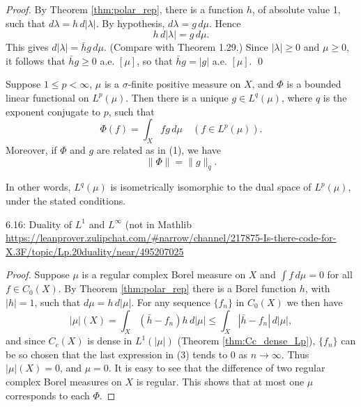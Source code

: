 \begin{proof}
  By Theorem \ref{thm:polar_rep}, there is a function $h$, of absolute value 1, such that $d\lambda = h \, d|\lambda|$. By hypothesis, $d\lambda = g \, d\mu$. Hence
  \[
    h \, d|\lambda| = g \, d\mu.
  \]
  This gives $d|\lambda| = \bar{h}g \, d\mu$. (Compare with Theorem 1.29.)
  Since $|\lambda| \geq 0$ and $\mu \geq 0$, it follows that $\bar{h}g \geq 0$ a.e. $[\mu]$, so that $\bar{h}g = |g|$ a.e. $[\mu]$. \qed
\end{proof}

\begin{theorem}[Rudin 6.16]
  \label{thm:Lp_duality}
  Suppose $1 \leq p < \infty$, $\mu$ is a $\sigma$-finite positive measure on $X$, and $\Phi$ is a bounded linear functional on $L^p(\mu)$. Then there is a unique $g \in L^q(\mu)$, where $q$ is the exponent conjugate to $p$, such that
  \begin{equation}
    \Phi(f) = \int_X fg \, d\mu \quad (f \in L^p(\mu)).
  \end{equation}
  Moreover, if $\Phi$ and $g$ are related as in (1), we have
  \begin{equation}
    \|\Phi\| = \|g\|_q.
  \end{equation}

  In other words, $L^q(\mu)$ is isometrically isomorphic to the dual space of $L^p(\mu)$, under the stated conditions.
\end{theorem}
6.16: Duality of $L^1$ and $L^∞$ (not in Mathlib
\url{https://leanprover.zulipchat.com/#narrow/channel/217875-Is-there-code-for-X.3F/topic/Lp.20duality/near/495207025}

\begin{proof}
  Suppose $\mu$ is a regular complex Borel measure on $X$ and $\int f \, d\mu = 0$ for all $f \in C_0(X)$.
  By Theorem \ref{thm:polar_rep} there is a Borel function $h$, with $|h| = 1$, such that $d\mu = h \, d|\mu|$.
  For any sequence $\{f_n\}$ in $C_0(X)$ we then have
  \begin{equation}
    |\mu|(X) = \int_X (\bar{h} - f_n)h \, d|\mu| \leq \int_X |\bar{h} - f_n| \, d|\mu|, \tag{3}
  \end{equation}
  and since $C_c(X)$ is dense in $L^1(|\mu|)$ (Theorem \ref{thm:Cc_dense_Lp}), $\{f_n\}$ can be so chosen that the last expression in (3) tends to 0 as $n \to \infty$.
  Thus $|\mu|(X) = 0$, and $\mu = 0$.
  It is easy to see that the difference of two regular complex Borel measures on $X$ is regular.
  This shows that at most one $\mu$ corresponds to each $\Phi$.
\end{proof}


